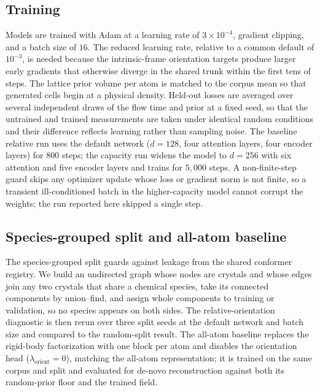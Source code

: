 \documentclass[11pt]{article}
\begin{document}
\subsection{Training}
Models are trained with Adam at a learning rate of $3\times10^{-4}$, gradient
clipping, and a batch size of $16$. The reduced learning rate, relative to a
common default of $10^{-3}$, is needed because the intrinsic-frame orientation
targets produce larger early gradients that otherwise diverge in the shared
trunk within the first tens of steps. The lattice prior volume per atom is
matched to the corpus mean so that generated cells begin at a physical density.
Held-out losses are averaged over several independent draws of the flow time and
prior at a fixed seed, so that the untrained and trained measurements are taken
under identical random conditions and their difference reflects learning rather
than sampling noise. The baseline relative run uses the default network
($d{=}128$, four attention layers, four encoder layers) for $800$ steps; the
capacity run widens the model to $d{=}256$ with six attention and five encoder
layers and trains for $5{,}000$ steps. A non-finite-step guard skips any
optimizer update whose loss or gradient norm is not finite, so a transient
ill-conditioned batch in the higher-capacity model cannot corrupt the weights;
the run reported here skipped a single step.

\subsection{Species-grouped split and all-atom baseline}
The species-grouped split guards against leakage from the shared conformer
registry. We build an undirected graph whose nodes are crystals and whose edges
join any two crystals that share a chemical species, take its connected
components by union--find, and assign whole components to training or validation,
so no species appears on both sides. The relative-orientation diagnostic is then
rerun over three split seeds at the default network and batch size and compared to
the random-split result. The all-atom baseline replaces the rigid-body
factorization with one block per atom and disables the orientation head
($\lambda_{\text{orient}}=0$), matching the all-atom representation; it is trained
on the same corpus and split and evaluated for de-novo reconstruction against both
its random-prior floor and the trained field.
\end{document}
